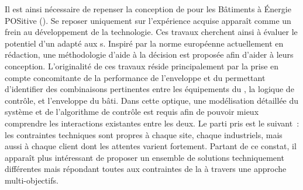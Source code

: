 Il est ainsi nécessaire de repenser la conception de  pour les Bâtiments à
Énergie POSitive (). Se reposer uniquement sur l’expérience acquise apparaît
comme un frein au développement de la technologie. Ces travaux cherchent ainsi à évaluer
le potentiel d’un  adapté aux s. Inspiré par la norme européenne
 actuellement en rédaction, une méthodologie d’aide à la décision est
proposée afin d’aider à leurs conception. L’originalité de ces travaux réside
principalement par la prise en compte concomitante de la performance de l’enveloppe et du
 permettant d’identifier des combinaisons pertinentes entre les équipements du
, la logique de contrôle, et l’enveloppe du bâti. Dans cette optique, une
modélisation détaillée du système et de l’algorithme de contrôle est requis afin de
pouvoir mieux comprendre les interactions existantes entre les deux. Le parti pris est le
suivant~: les contraintes techniques sont propres à chaque site, chaque industriels, mais
aussi à chaque client dont les attentes varient fortement. Partant de ce constat, il
apparaît plus intéressant de proposer un ensemble de solutions techniquement différentes
mais répondant toutes aux contraintes de la  à travers une approche
multi-objectifs.

